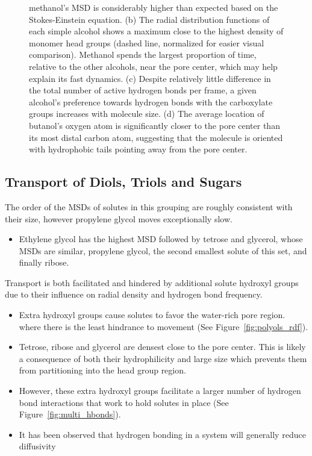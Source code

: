 \documentclass{article}
\begin{document}
\begin{figure}
{  methanol's MSD is considerably higher than expected based on the Stokes-Einstein equation. 
  (b) The radial distribution functions of each simple alcohol shows a maximum close
  to the highest density of monomer head groups (dashed line, normalized for easier visual
  comparison). Methanol spends the largest proportion of time, relative to the other alcohols,
  near the pore center, which may help explain its fast dynamics. (c) Despite relatively little
  difference in the total number of active hydrogen bonds per frame, a given alcohol's preference
  towards hydrogen bonds with the carboxylate groups increases with molecule size. (d) The average
  location of butanol's oxygen atom is significantly closer to the pore center than its most distal
  carbon atom, suggesting that the molecule is oriented with hydrophobic tails pointing away from
  the pore center.}\label{fig:simple_alcohols}
  \end{figure}

  \subsection*{Transport of Diols, Triols and Sugars}\label{section:polyols}
  
  The order of the MSDs of solutes in this grouping are roughly consistent with 
  their size, however propylene glycol moves exceptionally slow.  %
  \begin{itemize}
  	\item Ethylene glycol has the highest MSD followed by tetrose
  	and glycerol, whose MSDs are similar, propylene glycol, the second smallest
  	solute of this set, and finally ribose.
  \end{itemize}
  
  Transport is both facilitated and hindered by additional solute hydroxyl groups
  due to their influence on radial density and hydrogen bond frequency.  	
  \begin{itemize} 
    \item Extra hydroxyl groups cause solutes to favor the water-rich pore region.
    where there is the least hindrance to movement (See Figure~\ref{fig:polyols_rdf}).
    \item Tetrose, ribose and glycerol are densest close to the pore center. This is 
    likely a consequence of both their hydrophilicity and large size which prevents
    them from partitioning into the head group region.
    \item However, these extra hydroxyl groups facilitate a larger number of 
    hydrogen bond interactions that work to hold solutes in place (See Figure~\ref{fig:multi_hbonds}).
    \item It has been observed that hydrogen bonding in a system will generally
    reduce diffusivity~\cite{srinivas_computer_1999}
  \end{itemize}
  
\end{document}
